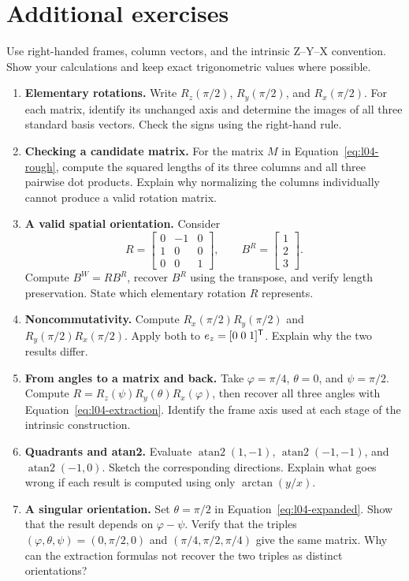 \section{Additional exercises}
Use right-handed frames, column vectors, and the intrinsic Z--Y--X convention.
Show your calculations and keep exact trigonometric values where possible.
\begin{enumerate}
\item \textbf{Elementary rotations.}
Write $R_z(\pi/2)$, $R_y(\pi/2)$, and $R_x(\pi/2)$. For each matrix,
identify its unchanged axis and determine the images of all three standard
basis vectors. Check the signs using the right-hand rule.

\item \textbf{Checking a candidate matrix.}
For the matrix $M$ in Equation~\eqref{eq:l04-rough}, compute the squared
lengths of its three columns and all three pairwise dot products. Explain why
normalizing the columns individually cannot produce a valid rotation matrix.

\item \textbf{A valid spatial orientation.}
Consider
\[
 R=\begin{bmatrix}0&-1&0\\1&0&0\\0&0&1\end{bmatrix},\qquad
 B^R=\begin{bmatrix}1\\2\\3\end{bmatrix}.
\]
Compute $B^W=RB^R$, recover $B^R$ using the transpose, and verify length
preservation. State which elementary rotation $R$ represents.

\item \textbf{Noncommutativity.}
Compute $R_x(\pi/2)R_y(\pi/2)$ and $R_y(\pi/2)R_x(\pi/2)$.
Apply both to $e_z=[0\;0\;1]^{\mathsf T}$. Explain why the two results differ.

\item \textbf{From angles to a matrix and back.}
Take $\varphi=\pi/4$, $\theta=0$, and $\psi=\pi/2$.
Compute $R=R_z(\psi)R_y(\theta)R_x(\varphi)$, then recover all three angles
with Equation~\eqref{eq:l04-extraction}. Identify the frame axis used at each
stage of the intrinsic construction.

\item \textbf{Quadrants and atan2.}
Evaluate $\operatorname{atan2}(1,-1)$,
$\operatorname{atan2}(-1,-1)$, and $\operatorname{atan2}(-1,0)$.
Sketch the corresponding directions. Explain what goes wrong if each result
is computed using only $\arctan(y/x)$.

\item \textbf{A singular orientation.}
Set $\theta=\pi/2$ in Equation~\eqref{eq:l04-expanded}. Show that the
result depends on $\varphi-\psi$. Verify that the triples
$(\varphi,\theta,\psi)=(0,\pi/2,0)$ and $(\pi/4,\pi/2,\pi/4)$ give
the same matrix. Why can the extraction formulas not recover the two triples
as distinct orientations?
\end{enumerate}
